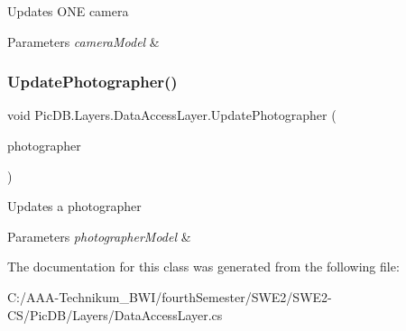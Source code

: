 Updates O\+NE camera 


\begin{DoxyParams}{Parameters}
{\em camera\+Model} & \\
\hline
\end{DoxyParams}
\mbox{\label{class_pic_d_b_1_1_layers_1_1_data_access_layer_a6ec13a97382256d357823c17f40bcf65}} 
\subsubsection{\texorpdfstring{Update\+Photographer()}{UpdatePhotographer()}}
{\footnotesize\ttfamily void Pic\+D\+B.\+Layers.\+Data\+Access\+Layer.\+Update\+Photographer (\begin{DoxyParamCaption}\item[{\mbox{\hyperlink{class_pic_d_b_1_1_models_1_1_photographer_model}{Photographer\+Model}}}]{photographer }\end{DoxyParamCaption})}



Updates a photographer 


\begin{DoxyParams}{Parameters}
{\em photographer\+Model} & \\
\hline
\end{DoxyParams}


The documentation for this class was generated from the following file\+:\begin{DoxyCompactItemize}
\item 
C\+:/\+A\+A\+A-\/\+Technikum\+\_\+\+B\+W\+I/fourth\+Semester/\+S\+W\+E2/\+S\+W\+E2-\/\+C\+S/\+Pic\+D\+B/\+Layers/Data\+Access\+Layer.\+cs\end{DoxyCompactItemize}
